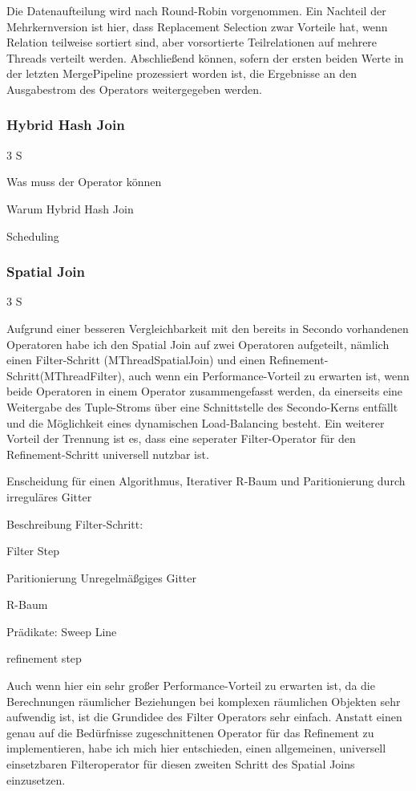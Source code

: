 \documentclass[a4paper,12pt,twoside]{article}
\begin{document}
Die Datenaufteilung wird nach Round-Robin vorgenommen. Ein Nachteil der Mehrkernversion ist hier, dass Replacement Selection zwar Vorteile hat, wenn Relation teilweise sortiert sind, aber vorsortierte Teilrelationen auf mehrere Threads verteilt werden. Abschließend können, sofern der ersten beiden Werte in der letzten MergePipeline prozessiert worden ist, die Ergebnisse an den Ausgabestrom des Operators weitergegeben werden.

\subsubsection{Hybrid Hash Join} 3 S

Was muss der Operator können

Warum Hybrid Hash Join

Scheduling



\subsubsection{Spatial Join} 3 S

Aufgrund einer besseren Vergleichbarkeit mit den bereits in Secondo vorhandenen Operatoren habe ich den Spatial Join auf zwei Operatoren aufgeteilt, nämlich einen Filter-Schritt (MThreadSpatialJoin) und einen Refinement-Schritt(MThreadFilter), auch wenn ein Performance-Vorteil zu erwarten ist, wenn beide Operatoren in einem Operator zusammengefasst werden, da einerseits eine Weitergabe des Tuple-Stroms über eine Schnittstelle des Secondo-Kerns entfällt und die Möglichkeit eines dynamischen Load-Balancing besteht. Ein weiterer Vorteil der Trennung ist es, dass eine seperater Filter-Operator für den Refinement-Schritt universell nutzbar ist.

Enscheidung für einen Algorithmus, Iterativer R-Baum und Paritionierung durch irreguläres Gitter

Beschreibung Filter-Schritt: 

Filter Step

Paritionierung Unregelmäßgiges Gitter

R-Baum

Prädikate: Sweep Line

refinement step

Auch wenn hier ein sehr großer Performance-Vorteil zu erwarten ist, da die Berechnungen räumlicher Beziehungen bei komplexen räumlichen Objekten sehr aufwendig ist, ist die Grundidee des Filter Operators sehr einfach. Anstatt einen genau auf die Bedürfnisse zugeschnittenen Operator für das Refinement zu implementieren, habe ich mich hier entschieden, einen allgemeinen, universell einsetzbaren Filteroperator für diesen zweiten Schritt des Spatial Joins einzusetzen. 
\end{document}
